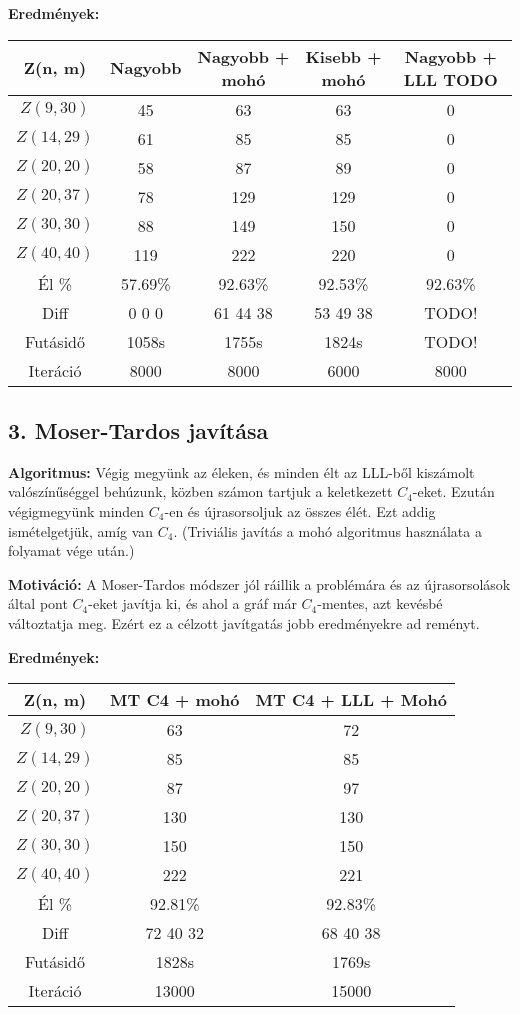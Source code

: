 \documentclass[12pt,a4paper]{article}
\begin{document}
\textbf{Eredmények:}
\begin{table}[H]
\centering
\begin{tabular}{|c|c|c|c|c|}
\hline
\textbf{Z(n, m)} & \textbf{Nagyobb} & \textbf{Nagyobb + mohó} & \textbf{Kisebb + mohó} & \textbf{Nagyobb + LLL TODO} \\
\hline
$Z(9,30)$  & 45 & 63 & 63 & 0 \\
$Z(14, 29)$ & 61 & 85 & 85 & 0 \\
$Z(20, 20)$ & 58 & 87 & 89 & 0 \\
$Z(20, 37)$ & 78 & 129 & 129 & 0 \\
$Z(30, 30)$ & 88 & 149 & 150 & 0 \\
$Z(40, 40)$ & 119 & 222 & 220 & 0 \\
\hline
Él \% & 57.69\% & 92.63\% & 92.53\% & 92.63\%\\
\hline
Diff & 0 0 0 & 61 44 38 & 53 49 38 & TODO! \\
\hline
Futásidő & 1058s & 1755s & 1824s & TODO! \\
Iteráció & 8000 & 8000 & 6000 & 8000 \\
\hline
\end{tabular}
\end{table}

\subsection*{3. Moser-Tardos javítása}

\textbf{Algoritmus:} Végig megyünk az éleken, és minden élt az LLL-ből kiszámolt valószínűséggel behúzunk, közben számon tartjuk a keletkezett $C_4$-eket. Ezután végigmegyünk minden $C_4$-en és újrasorsoljuk az összes élét. Ezt addig ismételgetjük, amíg van $C_4$. (Triviális javítás a mohó algoritmus használata a folyamat vége után.)

\textbf{Motiváció:} A Moser-Tardos módszer jól ráillik a problémára és az újrasorsolások által pont $C_4$-eket javítja ki, és ahol a gráf már $C_4$-mentes, azt kevésbé változtatja meg. Ezért ez a célzott javítgatás jobb eredményekre ad reményt.

\textbf{Eredmények:}
\begin{table}[H]
\centering
\begin{tabular}{|c|c|c|}
\hline
\textbf{Z(n, m)} & \textbf{MT C4 + mohó} & \textbf{MT C4 + LLL + Mohó} \\
\hline
$Z(9,30)$  & 63 & 72 \\
$Z(14, 29)$ & 85 & 85 \\
$Z(20, 20)$ & 87 & 97 \\
$Z(20, 37)$ & 130 & 130 \\
$Z(30, 30)$ & 150 & 150 \\
$Z(40, 40)$ & 222 & 221 \\
\hline
Él \% & 92.81\% & 92.83\% \\
\hline
Diff & 72 40 32 & 68 40 38 \\
\hline
Futásidő & 1828s & 1769s \\
Iteráció & 13000 & 15000 \\
\hline
\end{tabular}
\end{table}
\end{document}
